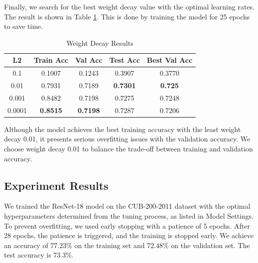 \documentclass[UTF8]{ctexart}
\begin{document}
Finally, we search for the best weight decay value with the optimal learning rates.
The result is shown in Table \ref{tab:wd}. This is done by training the model for 25 epochs to save time.

\begin{table}[h]
    \centering
    \caption{Weight Decay Results}
    \label{tab:wd}
    \begin{tabular}{|c|c|c|c|c|}
    \hline
    \textbf{L2} & \textbf{Train Acc} & \textbf{Val Acc} & \textbf{Test Acc} & \textbf{Best Val Acc} \\ \hline
    0.1    & 0.1007 & 0.1243 & 0.3907 & 0.3770 \\ \hline
    0.01   & 0.7931 & 0.7189 & \textbf{0.7301} & \textbf{0.725} \\ \hline
    0.001  & 0.8482 & 0.7198 & 0.7275 & 0.7248 \\ \hline
    0.0001 & \textbf{0.8515} & \textbf{0.7198} & 0.7287 & 0.7206 \\ \hline
    \end{tabular}
    \end{table}

Although the model achieves the best training accuracy with the least weight decay 0.01,
it presents serious overfitting issues with the validation accuracy. 
We choose weight decay 0.01 to balance the trade-off between training and validation accuracy.

\subsection{Experiment Results}
We trained the ResNet-18 model on the CUB-200-2011 dataset with the optimal hyperparameters determined from the tuning process,
as listed in Model Settings. To prevent overfitting, we used early stopping with a patience of 5 epochs.
After 28 epochs, the patience is triggered, and the training is stopped early.
We achieve an accuracy of 77.23\% on the training set and 72.48\% on the validation set.
The test accuracy is 73.3\%.
\end{document}
